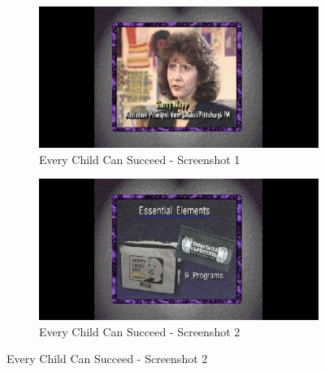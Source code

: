 \begin{figure}[H]
    \centering
    \begin{subfigure}{0.45\textwidth}
        \centering
        \includegraphics[width=\linewidth]{Games/EveryChildCanSucceed/Images/EveryChildCanSucceedScreenshot1.jpg}
        \caption{Every Child Can Succeed - Screenshot 1}
    \end{subfigure}
    \begin{subfigure}{0.45\textwidth}
        \centering
        \includegraphics[width=\linewidth]{Games/EveryChildCanSucceed/Images/EveryChildCanSucceedScreenshot2.jpg}
        \caption{Every Child Can Succeed - Screenshot 2}
    \end{subfigure}


\end{figure}
